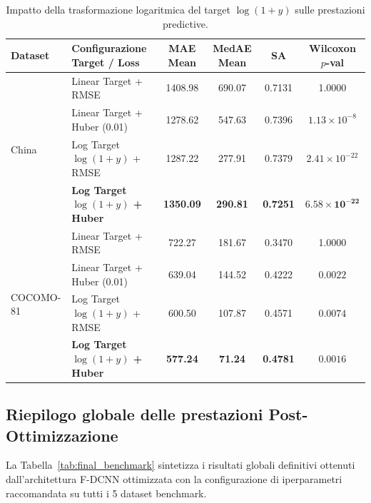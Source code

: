 \documentclass[11pt, a4paper]{article}
\begin{document}
\begin{table}[htbp]
    \centering
    \caption{Impatto della trasformazione logaritmica del target $\log(1+y)$ sulle prestazioni predictive.}\label{tab:target_transform}
    \small
    \begin{tabular}{llcccc}
        \toprule
        \rowcolor{tableheader} \textbf{Dataset} & \textbf{Configurazione Target / Loss}   & \textbf{MAE Mean} & \textbf{MedAE Mean} & \textbf{SA}     & \textbf{Wilcoxon $p$-val}       \\
        \midrule
        \multirow{4}{*}{China}                  & Linear Target + RMSE                    & 1408.98           & 690.07              & 0.7131          & 1.0000                          \\
                                                & Linear Target + Huber (0.01)             & 1278.62           & 547.63              & 0.7396          & $1.13 \times 10^{-8}$           \\
                                                & Log Target $\log(1+y)$ + RMSE           & 1287.22           & 277.91              & 0.7379          & $2.41 \times 10^{-22}$          \\
                                                & \textbf{Log Target $\log(1+y)$ + Huber} & \textbf{1350.09}  & \textbf{290.81}     & \textbf{0.7251} & $\mathbf{6.58 \times 10^{-22}}$ \\
        \midrule
        \multirow{4}{*}{COCOMO-81}              & Linear Target + RMSE                    & 722.27            & 181.67              & 0.3470          & 1.0000                          \\
                                                & Linear Target + Huber (0.01)             & 639.04            & 144.52              & 0.4222          & $0.0022$                        \\
                                                & Log Target $\log(1+y)$ + RMSE           & 600.50            & 107.87              & 0.4571          & $0.0074$                        \\
                                                & \textbf{Log Target $\log(1+y)$ + Huber} & \textbf{577.24}   & \textbf{71.24}      & \textbf{0.4781} & $\mathbf{0.0016}$               \\
        \bottomrule
    \end{tabular}
\end{table}

\subsection{Riepilogo globale delle prestazioni Post-Ottimizzazione}
La Tabella~\ref{tab:final_benchmark} sintetizza i risultati globali definitivi
ottenuti dall'architettura F-DCNN ottimizzata con la configurazione di
iperparametri raccomandata su tutti i 5 dataset benchmark.
\end{document}
